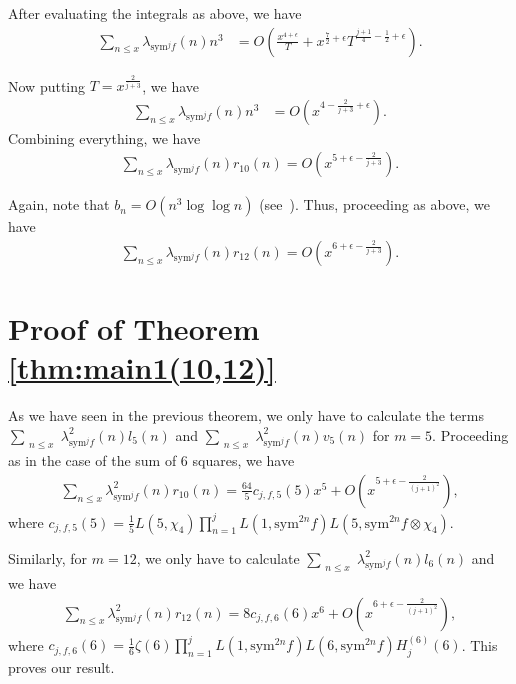 \documentclass[10pt]{amsart}
\begin{document}
After evaluating the integrals as above, we have 
\begin{align}
    \sum_{n\leq x}\lambda_{\mathrm{sym}^j f}(n)n^3 &= O\left(\frac{x^{4+\epsilon}}{T}+x^{\frac{7}{2}+\epsilon} T^{\frac{j+1}{4}-\frac{1}{2}+\epsilon} \right) .
\end{align}

Now putting $T= x^\frac{2}{j+3}$, we have 
\begin{align}
    \sum_{n\leq x}\lambda_{\mathrm{sym}^j f}(n)n^3 &= O\left(x^{4-\frac{2}{j+3}+\epsilon} \right) .
\end{align}
Combining everything, we have 
\begin{align}
    \sum_{n\leq x}\lambda_{\mathrm{sym}^j f}(n)r_{10}(n) = O\left( x^{5+\epsilon - \frac{2}{j+3}} \right).
\end{align}

Again, note that $b_n = O(n^3\log\log n)$ (see~\cite{Grosswald}). Thus, proceeding as above, we have \begin{align}
    \sum_{n\leq x}\lambda_{\mathrm{sym}^j f}(n)r_{12}(n) = O\left( x^{6+\epsilon - \frac{2}{j+3}} \right).
\end{align}

\section{Proof of Theorem \ref{thm:main1(10,12)}} \label{sec:main1(10,12)}

As we have seen in the previous theorem, we only have to calculate the terms $\sum_{\substack{n\leq x}}\lambda_{\mathrm{sym}^jf}^2(n)l_5(n)$ and $\sum_{\substack{n\leq x}}\lambda_{\mathrm{sym}^jf}^2(n)v_5(n)$ for $m=5$. Proceeding as in the case of the sum of $6$ squares, we have 
\begin{align}
    \sum_{n\leq x}\lambda_{\mathrm{sym}^{j}f}^2(n)r_{10}(n) = \frac{64}{5}c_{j,f,5}(5)x^5 + O\left( x^{5+\epsilon-\frac{2}{(j+1)^2}} \right),
\end{align}
where $c_{j,f,5}(5) = \frac{1}{5}L(5,\chi_4)\prod_{n=1}^{j}L(1,\mathrm{sym}^{2n}f)L(5,\mathrm{sym}^{2n}f \otimes\chi_4)$.

Similarly, for $m=12$, we only have to calculate $\sum_{\substack{n\leq x}}\lambda_{\mathrm{sym}^jf}^2(n)l_6(n)$ and we have 
\begin{align}
    \sum_{n\leq x}\lambda_{\mathrm{sym}^{j}f}^2(n)r_{12}(n) = 8c_{j,f,6}(6)x^6 + O\left( x^{6+\epsilon-\frac{2}{(j+1)^2}} \right),
\end{align}
where $c_{j,f,6}(6) = \frac{1}{6}\zeta(6)\prod_{n=1}^{j}L(1,\mathrm{sym}^{2n}f)L(6,\mathrm{sym}^{2n}f)H_{j}^{(6)}(6)$. This proves our result.
\end{document}
